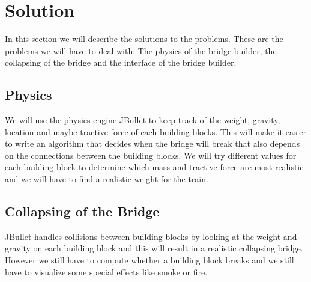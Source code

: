 \section{Solution}
In this section we will describe the solutions to the problems. These are the problems we will have to deal with: The physics of the bridge builder, the collapsing of the bridge and  the interface of the bridge builder.
\subsection{Physics}
We will use the physics engine JBullet to keep track of the weight, gravity, location and maybe tractive force of each building blocks. This will make it easier to write an algorithm that decides when the bridge will break that also depends on the connections between the building blocks. We will try different values for each building block to determine which mass and tractive force are most realistic and we will have to find a realistic weight for the train. 
\subsection{Collapsing of the Bridge}
JBullet handles collisions between building blocks by looking at the weight and gravity on each building block and this will result in a realistic collapsing bridge. However we still have to compute whether a building block breaks and we still have to visualize some special effects like smoke or fire.
